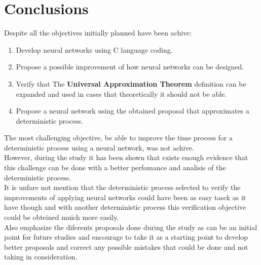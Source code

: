 \documentclass[a4paper, 11pt]{article}
\begin{document}
\section{Conclusions}
Despite all the objectives initially planned have been achive:
\begin{enumerate}
    \item Develop neural networks using C language coding.
    \item Propose a possible improvement of how neural networks can be designed.
    \item Verify that The \textbf{Universal Approximation Theorem} definition can be expanded and used in cases that theoretically it should not be able.
    \item Propose a neural network using the obtained proposal that approximates a deterministic process.
\end{enumerate} 
The most challenging objective, be able to improve the time process for a deterministic process using a neural network, was not achive.\\
However, during the study it has been shown that exists enough evidence that this challenge can be done with a better perfomance and analisis of the deterministic process.\\
It is unfare not mention that the deterministic process selected to verify the improvements of applying neural networks could have been as easy tasck as it have though and with another deterministic process this verification objective could be obteined muich more easily.\\
Also emphasize the diferents proposals done during the study as can be an initial point for future studies and encourage to take it as a starting point to develop better proposals and correct any possible mistakes that could be done and not taking in consideration.\\
\end{document}
